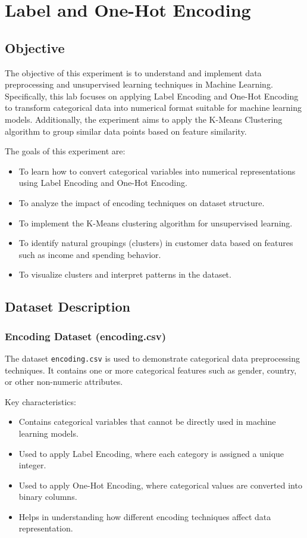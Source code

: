 \documentclass[11pt,a4paper]{report}
\begin{document}
\chapter{Label and One-Hot Encoding}

\section*{Objective}
The objective of this experiment is to understand and implement data preprocessing and unsupervised learning techniques in Machine Learning. Specifically, this lab focuses on applying Label Encoding and One-Hot Encoding to transform categorical data into numerical format suitable for machine learning models. Additionally, the experiment aims to apply the K-Means Clustering algorithm to group similar data points based on feature similarity.

The goals of this experiment are:
\begin{itemize}
    \item To learn how to convert categorical variables into numerical representations using Label Encoding and One-Hot Encoding.
    \item To analyze the impact of encoding techniques on dataset structure.
    \item To implement the K-Means clustering algorithm for unsupervised learning.
    \item To identify natural groupings (clusters) in customer data based on features such as income and spending behavior.
    \item To visualize clusters and interpret patterns in the dataset.
\end{itemize}

\section*{Dataset Description}

\subsection*{Encoding Dataset (encoding.csv)}
The dataset \texttt{encoding.csv} is used to demonstrate categorical data preprocessing techniques. It contains one or more categorical features such as gender, country, or other non-numeric attributes.

Key characteristics:
\begin{itemize}
    \item Contains categorical variables that cannot be directly used in machine learning models.
    \item Used to apply Label Encoding, where each category is assigned a unique integer.
    \item Used to apply One-Hot Encoding, where categorical values are converted into binary columns.
    \item Helps in understanding how different encoding techniques affect data representation.
\end{itemize}
\end{document}
